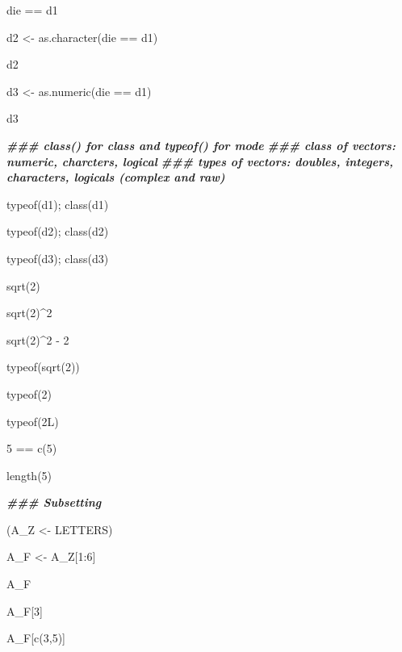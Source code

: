 \documentclass[
]{bxjsbook}
\newenvironment{Shaded}{\begin{snugshade}}{\end{snugshade}}
\newcommand{\DecValTok}[1]{\textcolor[rgb]{0.00,0.00,0.81}{#1}}
\newcommand{\DocumentationTok}[1]{\textcolor[rgb]{0.56,0.35,0.01}{\textbf{\textit{#1}}}}
\newcommand{\FunctionTok}[1]{\textcolor[rgb]{0.00,0.00,0.00}{#1}}
\newcommand{\NormalTok}[1]{#1}
\newcommand{\OtherTok}[1]{\textcolor[rgb]{0.56,0.35,0.01}{#1}}
\newcommand{\SpecialCharTok}[1]{\textcolor[rgb]{0.00,0.00,0.00}{#1}}
\theoremstyle{definition}
\theoremstyle{definition}
\theoremstyle{definition}
\theoremstyle{definition}
\theoremstyle{remark}
\begin{document}
\begin{Shaded}
\begin{Highlighting}[]
\NormalTok{die }\SpecialCharTok{==}\NormalTok{ d1}

\NormalTok{d2 }\OtherTok{\textless{}{-}} \FunctionTok{as.character}\NormalTok{(die }\SpecialCharTok{==}\NormalTok{ d1)}

\NormalTok{d2}

\NormalTok{d3 }\OtherTok{\textless{}{-}} \FunctionTok{as.numeric}\NormalTok{(die }\SpecialCharTok{==}\NormalTok{ d1)}

\NormalTok{d3}

\DocumentationTok{\#\#\# class() for class and typeof() for mode}
\DocumentationTok{\#\#\# class of vectors: numeric, charcters, logical}
\DocumentationTok{\#\#\# types of vectors: doubles, integers, characters, logicals (complex and raw)}

\FunctionTok{typeof}\NormalTok{(d1); }\FunctionTok{class}\NormalTok{(d1)}

\FunctionTok{typeof}\NormalTok{(d2); }\FunctionTok{class}\NormalTok{(d2)}

\FunctionTok{typeof}\NormalTok{(d3); }\FunctionTok{class}\NormalTok{(d3)}

\FunctionTok{sqrt}\NormalTok{(}\DecValTok{2}\NormalTok{)}

\FunctionTok{sqrt}\NormalTok{(}\DecValTok{2}\NormalTok{)}\SpecialCharTok{\^{}}\DecValTok{2}

\FunctionTok{sqrt}\NormalTok{(}\DecValTok{2}\NormalTok{)}\SpecialCharTok{\^{}}\DecValTok{2} \SpecialCharTok{{-}} \DecValTok{2}

\FunctionTok{typeof}\NormalTok{(}\FunctionTok{sqrt}\NormalTok{(}\DecValTok{2}\NormalTok{))}

\FunctionTok{typeof}\NormalTok{(}\DecValTok{2}\NormalTok{)}

\FunctionTok{typeof}\NormalTok{(2L)}

\DecValTok{5} \SpecialCharTok{==} \FunctionTok{c}\NormalTok{(}\DecValTok{5}\NormalTok{)}

\FunctionTok{length}\NormalTok{(}\DecValTok{5}\NormalTok{)}

\DocumentationTok{\#\#\# Subsetting}

\NormalTok{(A\_Z }\OtherTok{\textless{}{-}}\NormalTok{ LETTERS)}

\NormalTok{A\_F }\OtherTok{\textless{}{-}}\NormalTok{ A\_Z[}\DecValTok{1}\SpecialCharTok{:}\DecValTok{6}\NormalTok{]}

\NormalTok{A\_F}

\NormalTok{A\_F[}\DecValTok{3}\NormalTok{]}

\NormalTok{A\_F[}\FunctionTok{c}\NormalTok{(}\DecValTok{3}\NormalTok{,}\DecValTok{5}\NormalTok{)]}


\end{Highlighting}
\end{Shaded}
\end{document}
